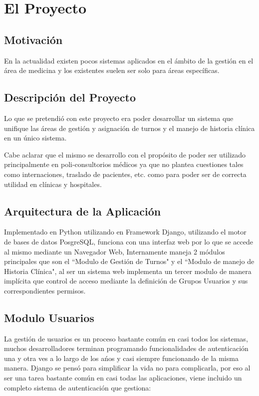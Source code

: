 \chapter{El Proyecto}


\section{Motivación}

En la actualidad existen pocos sistemas aplicados en el ámbito de la gestión en el área de medicina y los existentes suelen ser solo para áreas específicas.


\section{Descripción del Proyecto}

Lo que se pretendió con este proyecto era poder desarrollar un sistema que unifique las áreas de gestión y asignación de turnos y el manejo de historia clínica en un único sistema.

Cabe aclarar que el mismo se desarrollo con el propósito de poder ser utilizado principalmente en poli-consultorios médicos ya que no plantea cuestiones tales como internaciones, traslado de pacientes, etc. como para poder ser de correcta utilidad en clínicas y hospitales. 


\section{Arquitectura de la Aplicación}

Implementado en Python utilizando en Framework Django, utilizando el motor de bases de datos PosgreSQL, funciona con una interfaz web por lo que se accede al mismo mediante un Navegador Web, Internamente maneja 2 módulos principales que son el  ``Modulo de Gestión de Turnos" y el ``Modulo de manejo de
Historia Clínica", al ser un sistema web implementa un tercer modulo de manera implícita que control de acceso mediante la definición de Grupos Usuarios y sus correspondientes permisos.


\section{Modulo Usuarios}

La gestión de usuarios es un proceso bastante común en casi todos los sistemas, muchos desarrolladores terminan programando funcionalidades de autenticación una y otra ves a lo largo de los a\'nos y casi siempre funcionando de la misma manera. Django se pensó para simplificar la vida no para complicarla, por eso
al ser una tarea bastante común en casi todas las aplicaciones, viene incluido un completo sistema de autenticación que gestiona:

